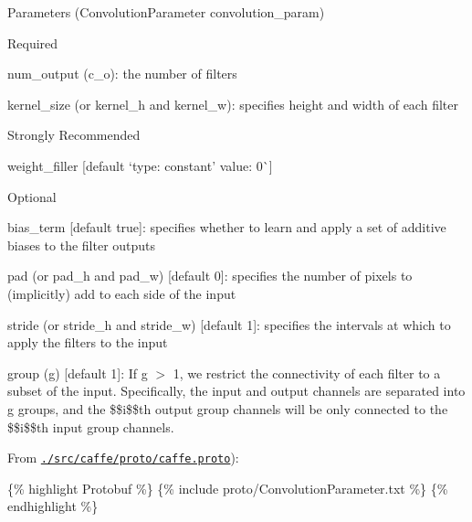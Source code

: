 \begin{DoxyItemize}
\item Parameters ({\ttfamily Convolution\+Parameter convolution\+\_\+param})
\begin{DoxyItemize}
\item Required
\begin{DoxyItemize}
\item {\ttfamily num\+\_\+output} ({\ttfamily c\+\_\+o})\+: the number of filters
\item {\ttfamily kernel\+\_\+size} (or {\ttfamily kernel\+\_\+h} and {\ttfamily kernel\+\_\+w})\+: specifies height and width of each filter
\end{DoxyItemize}
\item Strongly Recommended
\begin{DoxyItemize}
\item {\ttfamily weight\+\_\+filler} \mbox{[}default `type\+: \textquotesingle{}constant' value\+: 0\`{}\mbox{]}
\end{DoxyItemize}
\item Optional
\begin{DoxyItemize}
\item {\ttfamily bias\+\_\+term} \mbox{[}default {\ttfamily true}\mbox{]}\+: specifies whether to learn and apply a set of additive biases to the filter outputs
\item {\ttfamily pad} (or {\ttfamily pad\+\_\+h} and {\ttfamily pad\+\_\+w}) \mbox{[}default 0\mbox{]}\+: specifies the number of pixels to (implicitly) add to each side of the input
\item {\ttfamily stride} (or {\ttfamily stride\+\_\+h} and {\ttfamily stride\+\_\+w}) \mbox{[}default 1\mbox{]}\+: specifies the intervals at which to apply the filters to the input
\item {\ttfamily group} (g) \mbox{[}default 1\mbox{]}\+: If g $>$ 1, we restrict the connectivity of each filter to a subset of the input. Specifically, the input and output channels are separated into g groups, and the \$\$i\$\$th output group channels will be only connected to the \$\$i\$\$th input group channels.
\end{DoxyItemize}
\end{DoxyItemize}
\item From \href{https://github.com/BVLC/caffe/blob/master/src/caffe/proto/caffe.proto}{\tt {\ttfamily ./src/caffe/proto/caffe.proto}})\+:
\end{DoxyItemize}

\{\% highlight Protobuf \%\} \{\% include proto/\+Convolution\+Parameter.\+txt \%\} \{\% endhighlight \%\} 